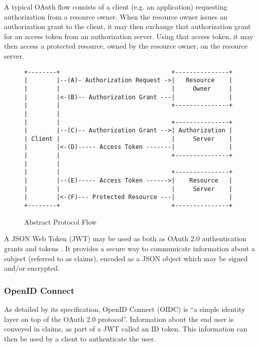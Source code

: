A typical OAuth flow consists of a client (e.g. an application) requesting authorization from a resource owner. When the resource owner issues an authorization grant to the client, it may then exchange that authorization grant for an access token from an authorization server. Using that access token, it may then access a protected resource, owned by the resource owner, on the resource server. \autocite{Hardt2023}
\begin{figure}[h]
\begin{scriptsize}
\begin{verbatim} 
+--------+                               +---------------+
|        |--(A)- Authorization Request ->|   Resource    |
|        |                               |     Owner     |
|        |<-(B)-- Authorization Grant ---|               |
|        |                               +---------------+
|        |
|        |                               +---------------+
|        |--(C)-- Authorization Grant -->| Authorization |
| Client |                               |     Server    |
|        |<-(D)----- Access Token -------|               |
|        |                               +---------------+
|        |
|        |                               +---------------+
|        |--(E)----- Access Token ------>|    Resource   |
|        |                               |     Server    |
|        |<-(F)--- Protected Resource ---|               |
+--------+                               +---------------+
\end{verbatim}
\end{scriptsize}
\caption{Abstract Protocol Flow \autocite{Hardt2023}}
\end{figure}

A JSON Web Token (JWT) may be used as both as OAuth 2.0 authentication grants and tokens \autocite{Jones2015a, Bertocci2021}. It provides a secure way to communicate information about a subject (referred to as claims), encoded as a JSON object which may be signed and/or encrypted. \autocite{Jones2015}

\subsubsection{OpenID Connect}
As detailed by its specification, OpenID Connect (OIDC) is ``a simple identity layer on top of the OAuth 2.0 protocol''. Information about the end user is conveyed in claims, as part of a JWT called an ID token. This information can then be used by a client to authenticate the user. \autocite{Sakimura2014} 

